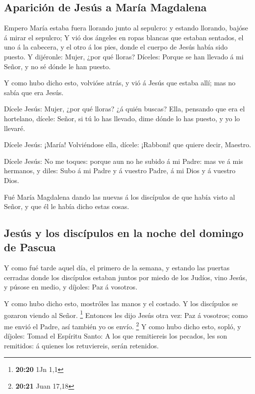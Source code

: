 \hypertarget{apariciuxf3n-de-jesuxfas-a-maruxeda-magdalena}{%
\subsection{Aparición de Jesús a María
Magdalena}\label{apariciuxf3n-de-jesuxfas-a-maruxeda-magdalena}}

 Empero María estaba fuera llorando junto al sepulcro: y
estando llorando, bajóse á mirar el sepulcro;  Y vió dos
ángeles en ropas blancas que estaban sentados, el uno á la cabecera, y
el otro á los pies, donde el cuerpo de Jesús había sido puesto.
 Y dijéronle: Mujer, ¿por qué lloras? Díceles: Porque se
han llevado á mi Señor, y no sé dónde le han puesto.

 Y como hubo dicho esto, volvióse atrás, y vió á Jesús
que estaba allí; mas no sabía que era Jesús.

 Dícele Jesús: Mujer, ¿por qué lloras? ¿á quién buscas?
Ella, pensando que era el hortelano, dícele: Señor, si tú lo has
llevado, dime dónde lo has puesto, y yo lo llevaré.

 Dícele Jesús: ¡María! Volviéndose ella, dícele:
¡Rabboni! que quiere decir, Maestro.

 Dícele Jesús: No me toques: porque aun no he subido á mi
Padre: mas ve á mis hermanos, y diles: Subo á mi Padre y á vuestro
Padre, á mi Dios y á vuestro Dios.

 Fué María Magdalena dando las nuevas á los discípulos de
que había visto al Señor, y que él le había dicho estas cosas.

\hypertarget{jesuxfas-y-los-discuxedpulos-en-la-noche-del-domingo-de-pascua}{%
\subsection{Jesús y los discípulos en la noche del domingo de
Pascua}\label{jesuxfas-y-los-discuxedpulos-en-la-noche-del-domingo-de-pascua}}

 Y como fué tarde aquel día, el primero de la semana, y
estando las puertas cerradas donde los discípulos estaban juntos por
miedo de los Judíos, vino Jesús, y púsose en medio, y díjoles: Paz á
vosotros.

 Y como hubo dicho esto, mostróles las manos y el
costado. Y los discípulos se gozaron viendo al Señor. \footnote{\textbf{20:20}
  1Jn 1,1}  Entonces les dijo Jesús otra vez: Paz á
vosotros; como me envió el Padre, así también yo os envío. \footnote{\textbf{20:21}
  Juan 17,18}  Y como hubo dicho esto, sopló, y díjoles:
Tomad el Espíritu Santo:  A los que remitiereis los
pecados, les son remitidos: á quienes los retuviereis, serán retenidos.

